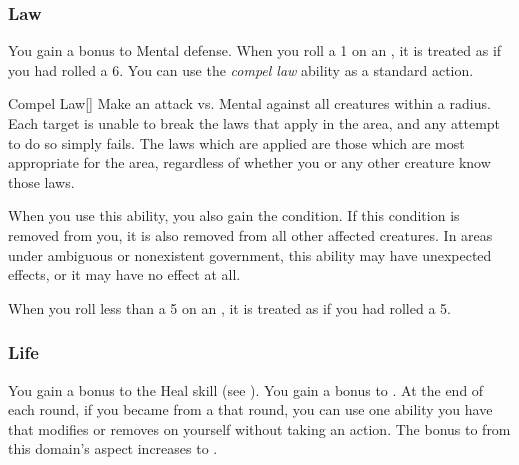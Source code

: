         \subsubsection{Law}
             You gain a  bonus to Mental defense.
             When you roll a 1 on an , it is treated as if you had rolled a 6.
             You can use the \textit{compel law} ability as a standard action.
            \begin{freeability}{Compel Law}[]
                Make an attack vs. Mental against all creatures within a \arealarge radius.
                \hit Each target is unable to break the laws that apply in the area, and any attempt to do so simply fails.
                The laws which are applied are those which are most appropriate for the area, regardless of whether you or any other creature know those laws.

                When you use this ability, you also gain the condition.
                If this condition is removed from you, it is also removed from all other affected creatures.
                In areas under ambiguous or nonexistent government, this ability may have unexpected effects, or it may have no effect at all.
            \end{freeability}
             When you roll less than a 5 on an , it is treated as if you had rolled a 5.

        \subsubsection{Life}
             You gain a  bonus to the Heal skill (see ).
             You gain a  bonus to .
             At the end of each round, if you became  from a  that round, you can use one  ability you have that modifies  or removes  on yourself without taking an action.
             The bonus to  from this domain's aspect increases to .

